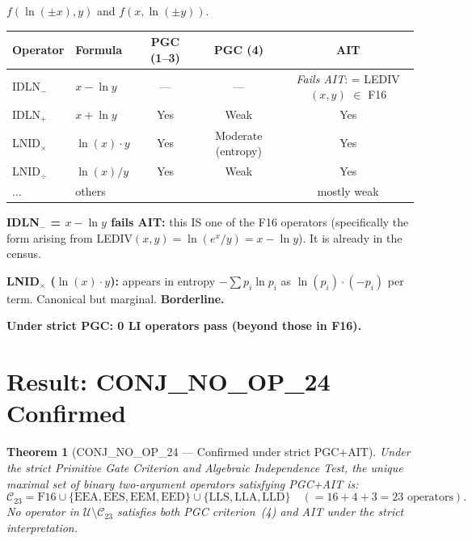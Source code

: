 \documentclass[11pt]{article}
\newtheorem{theorem}{Theorem}
\begin{document}
$f(\ln(\pm x), y)$ and $f(x, \ln(\pm y))$.

\begin{center}
\begin{tabular}{llccc}
\toprule
Operator & Formula & PGC (1--3) & PGC (4) & AIT \\
\midrule
IDLN$_-$ & $x - \ln y$ & --- & --- & \emph{Fails AIT}: = LEDIV$(x,y)$ $\in$ F16 \\
IDLN$_+$ & $x + \ln y$ & Yes & Weak & Yes \\
LNID$_\times$ & $\ln(x) \cdot y$ & Yes & Moderate (entropy) & Yes \\
LNID$_\div$ & $\ln(x) / y$ & Yes & Weak & Yes \\
$\ldots$ & others & & & mostly weak \\
\bottomrule
\end{tabular}
\end{center}

\noindent \textbf{IDLN$_-$ = $x - \ln y$ fails AIT:} this IS one of the F16 operators
(specifically the form arising from LEDIV$(x,y) = \ln(e^x/y) = x - \ln y$).
It is already in the census.

\noindent \textbf{LNID$_\times$ ($\ln(x) \cdot y$):} appears in entropy $-\sum p_i \ln p_i$
as $\ln(p_i) \cdot (-p_i)$ per term. Canonical but marginal. \textbf{Borderline.}

\textbf{Under strict PGC: 0 LI operators pass (beyond those in F16).}

\section{Result: CONJ\_NO\_OP\_24 Confirmed}
\label{sec:result}

\begin{theorem}[CONJ\_NO\_OP\_24 --- Confirmed under strict PGC+AIT]
\label{thm:no24}
Under the strict Primitive Gate Criterion and Algebraic Independence Test,
the unique maximal set of binary two-argument operators satisfying PGC+AIT is:
\[
  \mathcal{C}_{23} = \mathrm{F16} \cup \{\mathrm{EEA}, \mathrm{EES}, \mathrm{EEM}, \mathrm{EED}\}
  \cup \{\mathrm{LLS}, \mathrm{LLA}, \mathrm{LLD}\} \quad (= 16 + 4 + 3 = 23 \text{ operators}).
\]
No operator in $\mathcal{U} \setminus \mathcal{C}_{23}$ satisfies both PGC criterion~(4)
and AIT under the strict interpretation.
\end{theorem}
\end{document}
